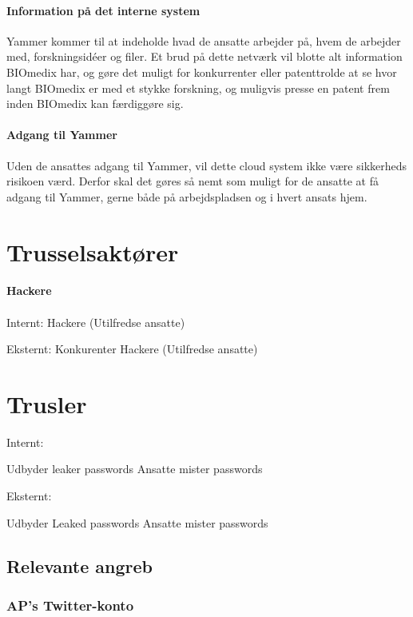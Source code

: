\documentclass{article}
\begin{document}
\paragraph{Information på det interne system}
Yammer kommer til at indeholde hvad de ansatte arbejder på, hvem de arbejder med, forskningsidéer og filer. Et brud på dette netværk vil blotte alt information BIOmedix har, og gøre det muligt for konkurrenter eller patenttrolde at se hvor langt BIOmedix er med et stykke forskning, og muligvis presse en patent frem inden BIOmedix kan færdiggøre sig. 

\paragraph{Adgang til Yammer}
Uden de ansattes adgang til Yammer, vil dette cloud system ikke være sikkerheds risikoen værd. Derfor skal det gøres så nemt som muligt for de ansatte at få adgang til Yammer, gerne både på arbejdspladsen og i hvert ansats hjem.  


\section{Trusselsaktører}

\paragraph{Hackere}

\paragraph{}

Internt:
Hackere
(Utilfredse ansatte)


Eksternt:
Konkurenter
Hackere
(Utilfredse ansatte)

\section{Trusler}

Internt:

Udbyder leaker passwords
Ansatte mister passwords

Eksternt:

Udbyder Leaked passwords
Ansatte mister passwords

\subsection{Relevante angreb}
\subsubsection{AP's Twitter-konto}
\end{document}
